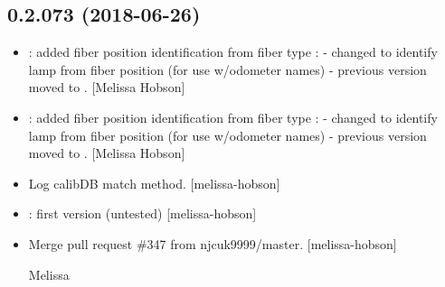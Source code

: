 \documentclass[a4paper,10pt,english]{report}
\begin{document}
\subsection{0.2.073 (2018-06-26)}
\label{\detokenize{misc/changelog:id410}}\begin{itemize}
\item {} 
: added fiber position identification from fiber
type : - changed to identify lamp from
fiber position (for use w/odometer names) - previous version moved to
. {[}Melissa Hobson{]}

\item {} 
: added fiber position identification from fiber
type : - changed to identify lamp from
fiber position (for use w/odometer names) - previous version moved to
. {[}Melissa Hobson{]}

\item {} 
Log calibDB match method. {[}melissa-hobson{]}

\item {} 
: first version (untested) {[}melissa-hobson{]}

\item {} 
Merge pull request \#347 from njcuk9999/master. {[}melissa-hobson{]}

Melissa

\end{itemize}
\end{document}
